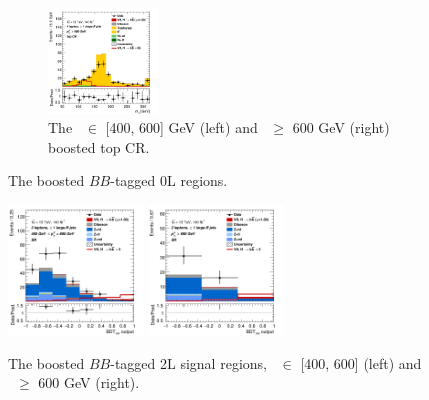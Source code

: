 \begin{figure}[h!]
\begin{subfigure}[b]{\textwidth}
        \includegraphics[width=0.32\textwidth]{Images/VH/Own_fit/prefit_VHbb/Region_distmBB_BMin600_incFat1_Fat1_DSRtopaddbjetcr_J0_TTypebb_incJet1_T2_L1_Y6051_Prefit.png}
        \caption{The \ptv\ $\in$ [400, 600] GeV (left) and \ptv\ $\geq$ 600 GeV (right) boosted top CR.}
        \label{fig:plots_VHbbBoost_1L_topCR}
    \end{subfigure}
    \caption{The boosted $BB$-tagged 0L regions.}
    \label{fig:plots_VHbbBoost_1L}
\end{figure} 

\vspace*{\fill}

\begin{figure}[h!]
    \centering
    \includegraphics[width=0.32\textwidth]{Images/VH/Own_fit/prefit_VHbb/Region_distmva_BMax600_BMin400_incFat1_Fat1_DSR_J0_TTypebb_incJet1_T2_L2_Y6051_Prefit.png}
    \includegraphics[width=0.32\textwidth]{Images/VH/Own_fit/prefit_VHbb/Region_distmva_BMin600_incFat1_Fat1_DSR_J0_TTypebb_incJet1_T2_L2_Y6051_Prefit.png}
    \caption{The boosted $BB$-tagged 2L signal regions, \ptv\ $\in$ [400, 600] (left) and \ptv\ $\geq$ 600 GeV (right).}
    \label{fig:plots_VHbbBoost_2L_SR}
\end{figure} 
